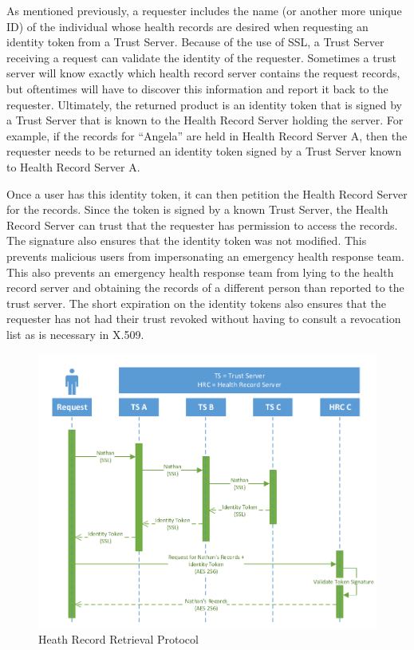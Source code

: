 As mentioned previously, a requester includes the name (or another more unique ID) of the individual whose health records are desired when requesting an identity token from a Trust Server. Because of the use of SSL, a Trust Server receiving a request can validate the identity of the requester. Sometimes a trust server will know exactly which health record server contains the request records, but oftentimes will have to discover this information and report it back to the requester. Ultimately, the returned product is an identity token that is signed by a Trust Server that is known to the Health Record Server holding the server. For example, if the records for ``Angela'' are held in Health Record Server A, then the requester needs to be returned an identity token signed by a Trust Server known to Health Record Server A.

Once a user has this identity token, it can then petition the Health Record Server for the records. Since the token is signed by a known Trust Server, the Health Record Server can trust that the requester has permission to access the records. The signature also ensures that the identity token was not modified. This prevents malicious users from impersonating an emergency health response team. This also prevents an emergency health response team from lying to the health record server and obtaining the records of a different person than reported to the trust server. The short expiration on the identity tokens also ensures that the requester has not had their trust revoked without having to consult a revocation list as is necessary in X.509\cite{fongen1}\cite{fongen2011federated}.

\begin{figure}[h]
\begin{center}
\includegraphics[scale=.75]{Drawing2.pdf}
\caption{Heath Record Retrieval Protocol}
\end{center}
\end{figure}

